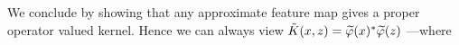 We conclude by showing that any approximate feature map gives a proper
operator valued kernel. Hence we can always view $\tilde{K}(x,
z)=\tildePhi{\omega}(x)^\adjoint \tildePhi{\omega}(z)$ ---where
